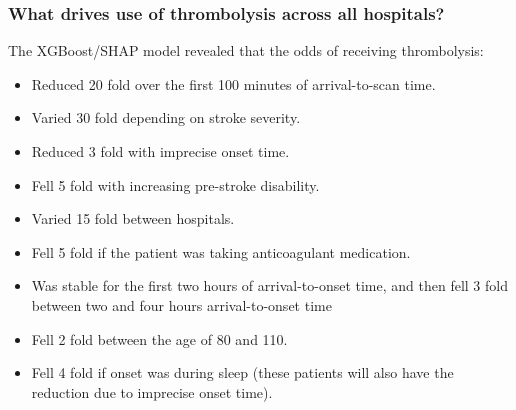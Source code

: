 \begin{frame}
\frametitle{What drives use of thrombolysis across all hospitals?}

The XGBoost/SHAP model revealed that the odds of receiving thrombolysis:

\vspace{2mm}

\begin{itemize}
    \setlength{\itemsep}{1.5mm}
    \item Reduced 20 fold over the first 100 minutes of arrival-to-scan time.
    \item Varied 30 fold depending on stroke severity.
    \item Reduced 3 fold with imprecise onset time.
    \item Fell 5 fold with increasing pre-stroke disability.
    \item Varied 15 fold between hospitals. 
    \item Fell 5 fold if the patient was taking anticoagulant medication.
    \item Was stable for the first two hours of arrival-to-onset time, and then fell 3 fold between two and four hours arrival-to-onset time
    \item Fell 2 fold between the age of 80 and 110.
    \item Fell 4 fold if onset was during sleep (these patients will also have the reduction due to imprecise onset time). 
\end{itemize}

\end{frame}